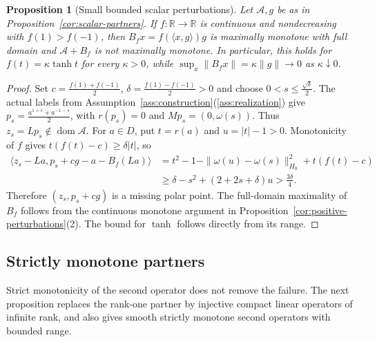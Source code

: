 \documentclass[11pt]{article}
\newcommand{\R}{\mathbb R}
\newcommand{\dom}{\operatorname{dom}}
\newcommand{\pair}[2]{\langle #1,#2\rangle}
\newtheorem{proposition}{Proposition}
\theoremstyle{definition}
\theoremstyle{remark}
\begin{document}
\begin{proposition}[Small bounded scalar perturbations]
\label{cor:small-bounded-partners}
Let $\mathcal A,g$ be as in Proposition~\ref{cor:scalar-partners}. If $f:\R\to\R$ is continuous and nondecreasing with $f(1)>f(-1)$, then $B_fx=f(\pair{x}{g})g$ is maximally monotone with full domain and $\mathcal A+B_f$ is not maximally monotone. In particular, this holds for $f(t)=\kappa\tanh t$ for every $\kappa>0$, while $\sup_x\|B_fx\|=\kappa\|g\|\to0$ as $\kappa\downarrow0$.
\end{proposition}
\begin{proof}
Set $c=\frac{f(1)+f(-1)}2$, $\delta=\frac{f(1)-f(-1)}2>0$ and choose $0<s\le\frac{\sqrt\delta}{2}$. The actual labels from Assumption~\ref{ass:construction}\textup{(\ref{ass:realization})} give $p_s=\frac{a^{1+s}+a^{-1-s}}2$, with $r(p_s)=0$ and $Mp_s=(0,\omega(s))$. Thus $z_s=Lp_s\notin\dom\mathcal A$. For $a\in D$, put $t=r(a)$ and $u=|t|-1>0$. Monotonicity of $f$ gives $t(f(t)-c)\ge\delta|t|$, so
\[
\begin{aligned}
\pair{z_s-La}{p_s+cg-a-B_f(La)}
&=t^2-1-\|\omega(u)-\omega(s)\|_{H_0}^2+t(f(t)-c)\\
&\ge\delta-s^2+(2+2s+\delta)u>\frac{3\delta}{4}.
\end{aligned}
\]
Therefore $(z_s,p_s+cg)$ is a missing polar point. The full-domain maximality of $B_f$ follows from the continuous monotone argument in Proposition~\ref{cor:positive-perturbations}(2). The bound for $\tanh$ follows directly from its range.
\end{proof}

\subsection{Strictly monotone partners}
\label{subsec:appendix-strict}

Strict monotonicity of the second operator does not remove the failure. The next proposition replaces the rank-one partner by injective compact linear operators of infinite rank, and also gives smooth strictly monotone second operators with bounded range.
\end{document}

